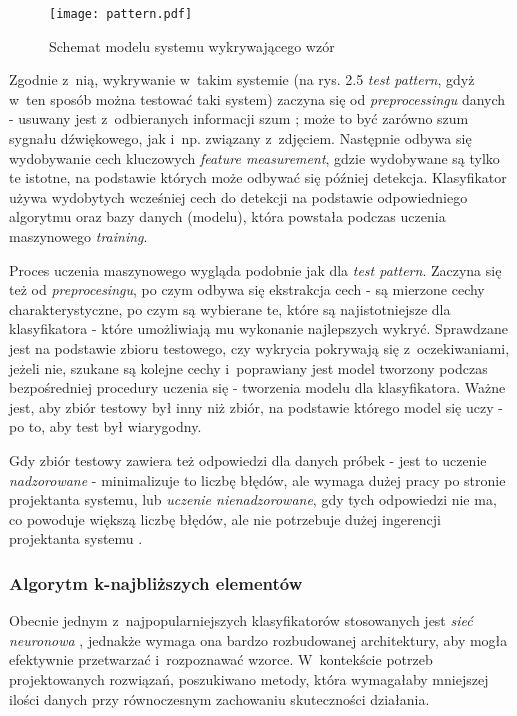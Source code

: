 \begin{figure}[h]
	\centering
	\texttt{[image: pattern.pdf]}
	\caption{Schemat modelu systemu wykrywającego wzór \cite{Pattern:ResearchGate}}
\end{figure}
\FloatBarrier %

Zgodnie z~nią, wykrywanie w~takim systemie (na rys. 2.5 \textit{test pattern}, gdyż w~ten sposób można testować taki system) zaczyna się od \textit{preprocessingu} danych - usuwany jest z~odbieranych informacji szum \cite{medium:pattern}; może to być zarówno szum sygnału dźwiękowego, jak i~np. związany z~zdjęciem. Następnie odbywa się wydobywanie cech kluczowych \textit{feature measurement}, gdzie wydobywane są tylko te istotne, na podstawie których może odbywać się później detekcja. Klasyfikator używa wydobytych wcześniej cech do detekcji na podstawie odpowiedniego algorytmu oraz bazy danych (modelu), która powstała podczas uczenia maszynowego \textit{training}.

Proces uczenia maszynowego wygląda podobnie jak dla \textit{test pattern}. Zaczyna się też od \textit{preprocesingu}, po czym odbywa się ekstrakcja cech - są mierzone cechy charakterystyczne, po czym są wybierane te, które są najistotniejsze dla klasyfikatora - które umożliwiają mu wykonanie najlepszych wykryć. Sprawdzane jest na podstawie zbioru testowego, czy wykrycia pokrywają się z~oczekiwaniami, jeżeli nie, szukane są kolejne cechy i~poprawiany jest model tworzony podczas bezpośredniej procedury uczenia się - tworzenia modelu dla klasyfikatora. Ważne jest, aby zbiór testowy był inny niż zbiór, na podstawie którego model się uczy - po to, aby test był wiarygodny.

Gdy zbiór testowy zawiera też odpowiedzi dla danych próbek - jest to uczenie \textit{nadzorowane} - minimalizuje to liczbę błędów, ale wymaga dużej pracy po stronie projektanta systemu, lub \textit{uczenie nienadzorowane}, gdy tych odpowiedzi nie ma, co powoduje większą liczbę błędów, ale nie potrzebuje dużej ingerencji projektanta systemu \cite{nadzor}.



\subsubsection{Algorytm k-najbliższych elementów}

Obecnie jednym z~najpopularniejszych klasyfikatorów stosowanych jest \textit{sieć neuronowa} \cite{Wiki:neuron}, jednakże wymaga ona bardzo rozbudowanej architektury, aby mogła efektywnie przetwarzać i~rozpoznawać wzorce. W~kontekście potrzeb projektowanych rozwiązań, poszukiwano metody, która wymagałaby mniejszej ilości danych przy równoczesnym zachowaniu skuteczności działania.

